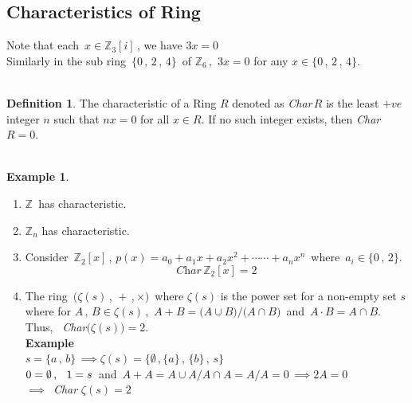 \documentclass[11pt,a4paper]{article}
\theoremstyle{definition}
\newtheorem{defn}[thm]{Definition}
\newtheorem{exa}[thm]{Example}
\begin{document}
\subsection{Characteristics of Ring}
Note that each $\, x\in \mathbb{Z}_3[i]\,$, we  have $3x = 0$\\
Similarly in the sub ring $\, \{0\, , \, 2\, , \, 4\}\, $ of $\mathbb{Z}_6\,, \, \, 3x = 0$ for any $x\in \{0\, , \, 2\, , \, 4\}$.\\\\





\begin{defn}
The characteristic of a Ring $R$ denoted as \textit{Char}$\,R$ is the least $+ve$ integer $n$ such that $nx = 0$ for all $x\in R$. If no such integer exists, then \textit{Char} $R = 0$.\\\\
\end{defn}




\begin{exa}
\begin{enumerate}
\item $\mathbb{Z}\,$ has characteristic.
\item $\mathbb{Z}_n$ has characteristic.
\item Consider $\, \mathbb{Z}_2[x]\, , \, p(x)  = a_0 + a_1 x + a_2 x^2 + \cdots\cdots + a_nx^n\,$ where  $\, a_i\in \{0\, , \, 2\}$.
$$\textit{Char}\, \mathbb{Z}_2 [x] = 2$$
\item The ring $\, \big(\zeta(s)\, , \, + \, , \times\big)\,$ where $\zeta (s)$ is the power set for a non-empty set $s$ where for $A\, , \, B\in \zeta (s)\, , \, \, A + B = \big(A\cup B\big)/\big(A\cap B\big)\,$ and $\, A\cdot B = A\cap B$.\\

Thus, $\, $ \textit{Char}$\big(\zeta (s)\big) = 2$.\\

\textbf{Example}\\

$s = \{a\, , \, b\} \, \implies \zeta (s) = \big\{\emptyset\, , \{a\}\, , \, \{b\}\, , \, s\big\}$\\

$0 = \emptyset\, ,\, \hspace{0.2cm}  1 = s\,$ and $\, A+ A = A\cup A/ A\cap A = A/A = 0\, \implies 2A = 0$\\

$\implies\, $ \textit{Char} $\zeta(s) = 2$\\\\
\end{enumerate}
\end{exa}
\end{document}
